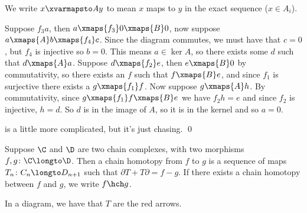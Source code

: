 \Proof We write $x\xvarmapsto Ay$ to mean $x$ maps to $y$ in the exact sequence ($x\in A_i$).
\benum
    \item Suppose $f_3a$, then $a\xmaps{f_3}0\xmaps{B}0$, now suppose $a\xmaps{A}b\xmaps{f_4}c$.
        Since the diagram commutes, we must have that $c=0$, but $f_4$ is injective so $b=0$.
        This means $a\in\ker A$, so there exists some $d$ such that $d\xmaps{A}a$.
        Suppose $d\xmaps{f_2}e$, then $e\xmaps{B}0$ by commutativity, so there exists an $f$ such that $f\xmaps{B}e$, and since $f_1$ is surjective there exists a $g\xmaps{f_1}f$.
        Now suppose $g\xmaps{A}h$.
        By commutativity, since $g\xmaps{f_1}f\xmaps{B}e$ we have $f_2h=e$ and since $f_2$ is injective, $h=d$.
        So $d$ is in the image of $A$, so it is in the kernel and so $a=0$.
    \item is a little more complicated, but it's just chasing.
        \qed
\eenum

\bdefn

    Suppose $\C$ and $\D$ are two chain complexes, with two morphisms $f,g\colon\C\longto\D$.
    Then a {\emphcolor chain homotopy} from $f$ to $g$ is a sequence of maps $T_n\colon C_n\longto D_{n+1}$ such that $\partial T+T\partial=f-g$.
    If there exists a chain homotopy between $f$ and $g$, we write $f\hch g$.

\edefn

In a diagram, we have that $T$ are the red arrows.

\bigskip
\centerline{\def\diagrowbuf{1cm}\def\diagcolbuf{1cm}}
\medskip

